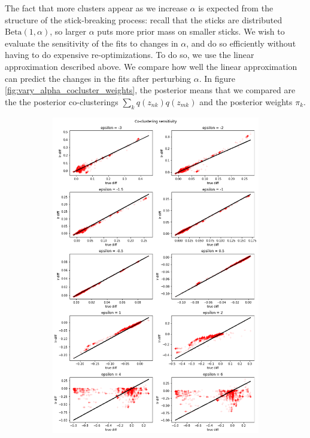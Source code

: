 \documentclass[a4paper]{article}
\begin{document}
The fact that more clusters appear as we increase $\alpha$ is expected from the structure
of the stick-breaking process: recall that the sticks are distributed $\text{Beta}(1, \alpha)$,
so larger $\alpha$ puts more prior mass on smaller sticks. We wish to evaluate the
sensitivity of the fits to changes in $\alpha$, and do so efficiently without having to
do expensive re-optimizations. To do so, we use the linear approximation described
above. We compare how well the linear approximation can predict the changes in the fits after perturbing $\alpha$.
In figure \ref{fig:vary_alpha_cocluster_weights}, the posterior means that we compared
are the the posterior co-clusterings $\sum_{k} q(z_{nk})q(z_{mk})$ and the posterior weights $\pi_k$.

\begin{figure}[h!]
	\centering
	\begin{subfigure}[t]{0.45\textwidth}
		\includegraphics[width = \textwidth]{./parametric_sensitivity_figs/cocluster_sensitivity.png}

\end{subfigure}
\end{figure}
\end{document}
